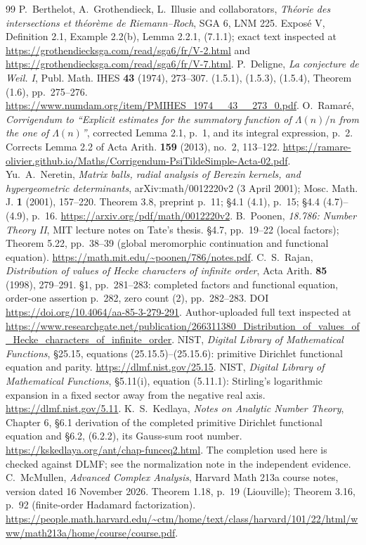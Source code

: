 \documentclass[11pt,a4paper]{article}
\begin{document}
\begin{thebibliography}{99}
 P.~Berthelot, A.~Grothendieck, L.~Illusie and collaborators, \emph{Th\'eorie des intersections et th\'eor\`eme de Riemann--Roch}, SGA 6, LNM 225. Expos\'e V, Definition 2.1, Example 2.2(b), Lemma 2.2.1, (7.1.1); exact text inspected at \url{https://grothendiecksga.com/read/sga6/fr/V-2.html} and \url{https://grothendiecksga.com/read/sga6/fr/V-7.html}.
 P.~Deligne, \emph{La conjecture de Weil. I}, Publ. Math. IHES \textbf{43} (1974), 273--307. (1.5.1), (1.5.3), (1.5.4), Theorem (1.6), pp.~275--276. \url{https://www.numdam.org/item/PMIHES_1974__43__273_0.pdf}.
 O.~Ramar\'e, \emph{Corrigendum to ``Explicit estimates for the summatory function of $\Lambda(n)/n$ from the one of $\Lambda(n)$''}, corrected Lemma 2.1, p.~1, and its integral expression, p.~2. Corrects Lemma 2.2 of Acta Arith. \textbf{159} (2013), no.~2, 113--122. \url{https://ramare-olivier.github.io/Maths/Corrigendum-PsiTildeSimple-Acta-02.pdf}.
 Yu.~A.~Neretin, \emph{Matrix balls, radial analysis of Berezin kernels, and hypergeometric determinants}, arXiv:math/0012220v2 (3 April 2001); Mosc. Math. J. \textbf{1} (2001), 157--220. Theorem 3.8, preprint p.~11; \S4.1 (4.1), p.~15; \S4.4 (4.7)--(4.9), p.~16. \url{https://arxiv.org/pdf/math/0012220v2}.
 B.~Poonen, \emph{18.786: Number Theory II}, MIT lecture notes on Tate's thesis. \S4.7, pp.~19--22 (local factors); Theorem 5.22, pp.~38--39 (global meromorphic continuation and functional equation). \url{https://math.mit.edu/~poonen/786/notes.pdf}.
 C.~S.~Rajan, \emph{Distribution of values of Hecke characters of infinite order}, Acta Arith. \textbf{85} (1998), 279--291. \S1, pp.~281--283: completed factors and functional equation, order-one assertion p.~282, zero count (2), pp.~282--283. DOI \url{https://doi.org/10.4064/aa-85-3-279-291}. Author-uploaded full text inspected at \url{https://www.researchgate.net/publication/266311380_Distribution_of_values_of_Hecke_characters_of_infinite_order}.
 NIST, \emph{Digital Library of Mathematical Functions}, \S25.15, equations (25.15.5)--(25.15.6): primitive Dirichlet functional equation and parity. \url{https://dlmf.nist.gov/25.15}.
 NIST, \emph{Digital Library of Mathematical Functions}, \S5.11(i), equation (5.11.1): Stirling's logarithmic expansion in a fixed sector away from the negative real axis. \url{https://dlmf.nist.gov/5.11}.
 K.~S.~Kedlaya, \emph{Notes on Analytic Number Theory}, Chapter 6, \S6.1 derivation of the completed primitive Dirichlet functional equation and \S6.2, (6.2.2), its Gauss-sum root number. \url{https://kskedlaya.org/ant/chap-funceq2.html}. The completion used here is checked against DLMF; see the normalization note in the independent evidence.
 C.~McMullen, \emph{Advanced Complex Analysis}, Harvard Math 213a course notes, version dated 16 November 2026. Theorem 1.18, p.~19 (Liouville); Theorem 3.16, p.~92 (finite-order Hadamard factorization). \url{https://people.math.harvard.edu/~ctm/home/text/class/harvard/101/22/html/www/math213a/home/course/course.pdf}.
\end{thebibliography}
\end{document}
